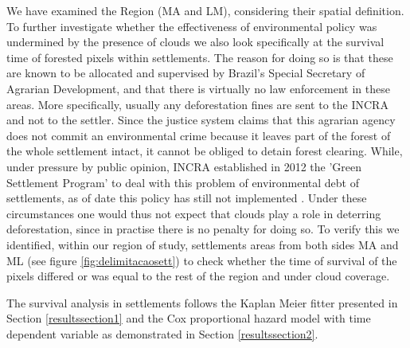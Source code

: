 We have examined the Region (MA and LM), considering their spatial definition. To further investigate whether the effectiveness of environmental policy was undermined by the presence of clouds we also look specifically at the survival time of forested pixels within settlements. The reason for doing so is that  these are known to be allocated and supervised by Brazil’s Special Secretary of Agrarian Development, and that there is virtually no law enforcement in these areas. More specifically, usually any deforestation fines are sent to the INCRA and not to the settler. Since the justice system claims that this agrarian agency does not commit an environmental crime because it leaves part of the forest of the whole settlement intact, it cannot be obliged to detain forest clearing. While, under pressure by public opinion, INCRA established in 2012 the 'Green Settlement Program' to deal with this problem of environmental debt of settlements, as of date this policy has still not implemented \citet{PACHECO,PERES2}. Under these circumstances one would thus not expect that clouds play a role in deterring deforestation, since in practise there is no penalty for doing so.  To verify this we identified, within our region of study, settlements areas from both sides MA and ML (see figure \ref{fig:delimitacaosett}) to check whether the time of survival of the pixels differed or was equal to the rest of the region and under cloud coverage.

The survival analysis in settlements follows the  Kaplan Meier fitter presented in  Section \ref{resultssection1} and the Cox proportional hazard model with time dependent variable as demonstrated in Section \ref{resultssection2}. 

